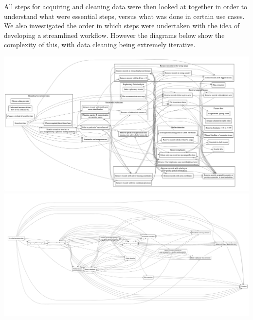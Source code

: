 \documentclass[
  letterpaper,
  DIV=11,
  numbers=noendperiod,
  oneside]{scrreprt}
\begin{document}
All steps for acquiring and cleaning data were then looked at together
in order to understand what were essential steps, versus what was done
in certain use cases. We also investigated the order in which steps were
undertaken with the idea of developing a streamlined workflow. However
the diagrams below show the complexity of this, with data cleaning being
extremely iterative.

\includegraphics{images/complex_workflow.png}
\includegraphics{images/simplified_workflow.png}
\end{document}
